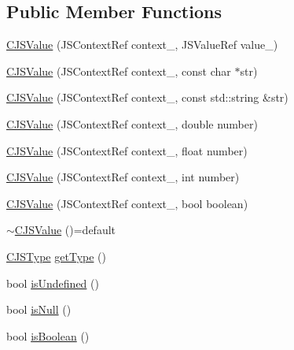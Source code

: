 \subsection*{Public Member Functions}
\begin{DoxyCompactItemize}
\item 
\mbox{\hyperlink{classcpp__javascriptcore_1_1_c_j_s_value_a3b46692e2d6b7b6873f9cb2d6f69ce3f}{C\+J\+S\+Value}} (J\+S\+Context\+Ref context\+\_\+, J\+S\+Value\+Ref value\+\_\+)
\item 
\mbox{\hyperlink{classcpp__javascriptcore_1_1_c_j_s_value_a7ebbccc7e59a83f0612da06e01e92b55}{C\+J\+S\+Value}} (J\+S\+Context\+Ref context\+\_\+, const char $\ast$str)
\item 
\mbox{\hyperlink{classcpp__javascriptcore_1_1_c_j_s_value_adf9c49abc4f66e73ee2e6f642a3f6004}{C\+J\+S\+Value}} (J\+S\+Context\+Ref context\+\_\+, const std\+::string \&str)
\item 
\mbox{\hyperlink{classcpp__javascriptcore_1_1_c_j_s_value_a3fc1d9f7c0fbbeb4be02f2e63bae3fc2}{C\+J\+S\+Value}} (J\+S\+Context\+Ref context\+\_\+, double number)
\item 
\mbox{\hyperlink{classcpp__javascriptcore_1_1_c_j_s_value_a18d9b9e9ac2f2e584d9f47b8322b5d95}{C\+J\+S\+Value}} (J\+S\+Context\+Ref context\+\_\+, float number)
\item 
\mbox{\hyperlink{classcpp__javascriptcore_1_1_c_j_s_value_a44a8773b602275ec032ca6e03b91cf39}{C\+J\+S\+Value}} (J\+S\+Context\+Ref context\+\_\+, int number)
\item 
\mbox{\hyperlink{classcpp__javascriptcore_1_1_c_j_s_value_a8f22e7073580f5b47f1aec5ad73b4f59}{C\+J\+S\+Value}} (J\+S\+Context\+Ref context\+\_\+, bool boolean)
\item 
\mbox{\hyperlink{classcpp__javascriptcore_1_1_c_j_s_value_a07053b33a34d05b062aad46259354ad0}{$\sim$\+C\+J\+S\+Value}} ()=default
\item 
\mbox{\hyperlink{classcpp__javascriptcore_1_1_c_j_s_value_a72505affa6537ee81f1d447fab22a890}{C\+J\+S\+Type}} \mbox{\hyperlink{classcpp__javascriptcore_1_1_c_j_s_value_acc5fe2be7c30be3224a2c865ddce97b5}{get\+Type}} ()
\item 
bool \mbox{\hyperlink{classcpp__javascriptcore_1_1_c_j_s_value_ae936ece8c2b5be6e532b0d4196ca2463}{is\+Undefined}} ()
\item 
bool \mbox{\hyperlink{classcpp__javascriptcore_1_1_c_j_s_value_afe087c43191d975a88ae46225c3d3888}{is\+Null}} ()
\item 
bool \mbox{\hyperlink{classcpp__javascriptcore_1_1_c_j_s_value_a9b15cae1f82cc7c5eece21cf31eca533}{is\+Boolean}} ()

\end{DoxyCompactItemize}
